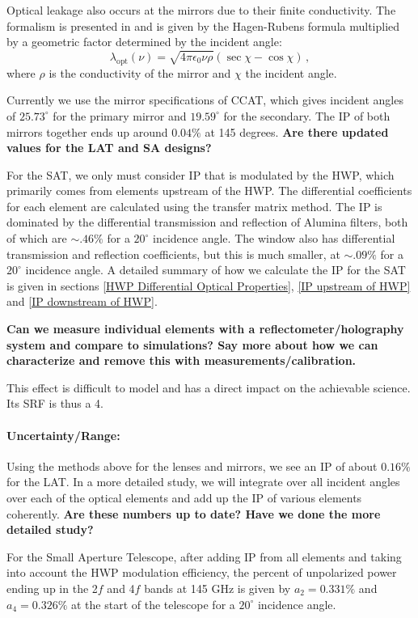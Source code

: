 Optical leakage also occurs at the mirrors due to their finite conductivity. 
The formalism is presented in \cite{Barkats:2005sh} and is given by the Hagen-Rubens formula multiplied by 
a geometric factor determined by the incident angle:
\begin{equation}
\lambda_\text{opt}(\nu) = \sqrt{4 \pi \epsilon_0 \nu \rho} (\sec \chi - \cos \chi) \, ,
\end{equation}
where $\rho$ is the conductivity of the mirror and $\chi$ the incident angle.

Currently we use the mirror specifications of CCAT, which gives incident angles of $25.73^\circ$ for the primary mirror 
and $19.59^\circ$ for the secondary. The IP of both mirrors together ends up around $0.04\%$ at 145 degrees. \textbf{Are there updated values for the LAT and SA designs?}


For the SAT, we only must consider IP that is modulated by the HWP, which primarily comes from elements upstream of the HWP.
The differential coefficients for each element are calculated using the transfer matrix method.
The IP is dominated by the differential transmission and reflection of Alumina filters, both of which are $\sim.46\%$ for a $20^\circ$ incidence angle. 
The window also has differential transmission and reflection coefficients, but this is much smaller,
at $\sim.09\%$ for a $20^\circ$ incidence angle.
A detailed summary of how we calculate the IP for the SAT is given in sections \ref{HWP Differential Optical Properties},
\ref{IP upstream of HWP} and \ref{IP downstream of HWP}. 

\textbf{Can we measure individual elements with a reflectometer/holography system and compare to simulations? Say more about how we can characterize and remove this with measurements/calibration.}

This effect is difficult to model and has a direct impact on the achievable science. Its SRF is thus a 4.

\paragraph{Uncertainty/Range:}
Using the methods above for the lenses and mirrors, we see an IP of about $0.16\%$ for the LAT.
In a more detailed study, we will integrate over all incident angles over each of the optical elements and add up the IP of various elements coherently. \textbf{Are these numbers up to date? Have we done the more detailed study?}

For the Small Aperture Telescope, after adding IP from all elements and taking into account the HWP modulation efficiency,
the percent of unpolarized power ending up in the 2$f$ and 4$f$ bands at 145 GHz is given by $a_2 = 0.331\%$ and $a_4 = 0.326\%$ 
at the start of the telescope for a $20^\circ$ incidence angle.

